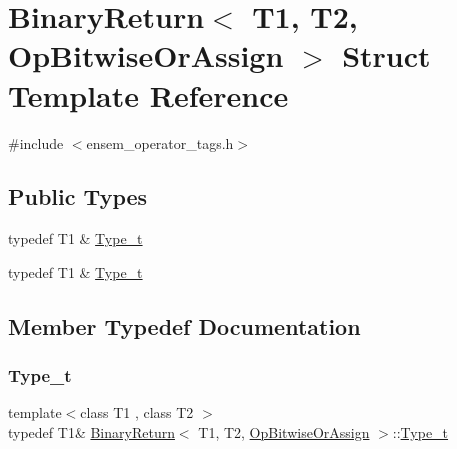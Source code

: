 \hypertarget{structBinaryReturn_3_01T1_00_01T2_00_01OpBitwiseOrAssign_01_4}{}\section{Binary\+Return$<$ T1, T2, Op\+Bitwise\+Or\+Assign $>$ Struct Template Reference}
\label{structBinaryReturn_3_01T1_00_01T2_00_01OpBitwiseOrAssign_01_4}


{\ttfamily \#include $<$ensem\+\_\+operator\+\_\+tags.\+h$>$}

\subsection*{Public Types}
\begin{DoxyCompactItemize}
\item 
typedef T1 \& \mbox{\hyperlink{structBinaryReturn_3_01T1_00_01T2_00_01OpBitwiseOrAssign_01_4_a256f1f50cdbaf032fbed109888ad5bfc}{Type\+\_\+t}}
\item 
typedef T1 \& \mbox{\hyperlink{structBinaryReturn_3_01T1_00_01T2_00_01OpBitwiseOrAssign_01_4_a256f1f50cdbaf032fbed109888ad5bfc}{Type\+\_\+t}}
\end{DoxyCompactItemize}


\subsection{Member Typedef Documentation}
\mbox{\label{structBinaryReturn_3_01T1_00_01T2_00_01OpBitwiseOrAssign_01_4_a256f1f50cdbaf032fbed109888ad5bfc}} 
\subsubsection{\texorpdfstring{Type\_t}{Type\_t}\hspace{0.1cm}{\footnotesize\ttfamily [1/2]}}
{\footnotesize\ttfamily template$<$class T1 , class T2 $>$ \\
typedef T1\& \mbox{\hyperlink{structBinaryReturn}{Binary\+Return}}$<$ T1, T2, \mbox{\hyperlink{structOpBitwiseOrAssign}{Op\+Bitwise\+Or\+Assign}} $>$\+::\mbox{\hyperlink{structBinaryReturn_3_01T1_00_01T2_00_01OpBitwiseOrAssign_01_4_a256f1f50cdbaf032fbed109888ad5bfc}{Type\+\_\+t}}}

